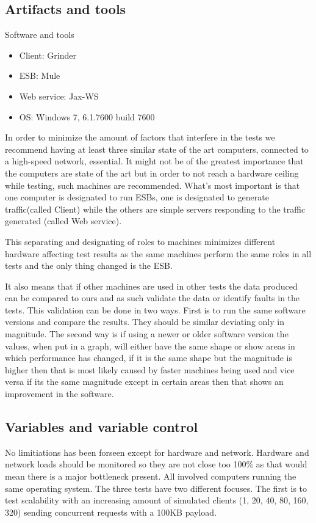 \subsection{Artifacts and tools}
\begin{table}[H]
	\caption{Software and tools}
	\begin{itemize}
		\item Client: Grinder \cite{whatisgrinder}
		\item ESB: Mule \cite{whatismule}
		\item Web service: Jax-WS \cite{whatisjaxws}
		\item OS: Windows 7, 6.1.7600 build 7600
	\end{itemize}
\end{table}
In order to minimize the amount of factors that interfere in the tests we recommend having at least three similar state of the art computers, connected to a high-speed network, essential.
It might not be of the greatest importance that the computers are state of the art but in order to not reach a hardware ceiling while testing, such machines are recommended. 
What's most important is that one computer is designated to run ESBs, one is designated to generate traffic(called Client) while the others are simple servers responding to the traffic generated (called Web service). 

This separating and designating of roles to machines minimizes different hardware affecting test results as the same machines perform the same roles in all tests and the only thing changed is the ESB. 

It also means that if other machines are used in other tests the data produced can be compared to ours and as such validate the data or identify faults in the tests. 
This validation can be done in two ways. 
First is to run the same software versions and compare the results. 
They should be similar deviating only in magnitude. The second way is if using a newer or older software version the values, when put in a graph, will either have the same shape or show areas in which performance has changed, 
if it is the same shape but the magnitude is higher then that is most likely caused by faster machines being used and vice versa if its the same magnitude except in certain areas then that shows an improvement in the software.

\subsection{Variables and variable control}
No limitiations has been forseen except for hardware and network.
Hardware and network loads should be monitored so they are not close too 100\% as that would mean there is a major bottleneck present. 
All involved computers running the same operating system.
The three tests have two different focuses. The first is to test scalability with an increasing amount of simulated clients (1, 20, 40, 80, 160, 320) sending concurrent requests with a 100KB payload. 
